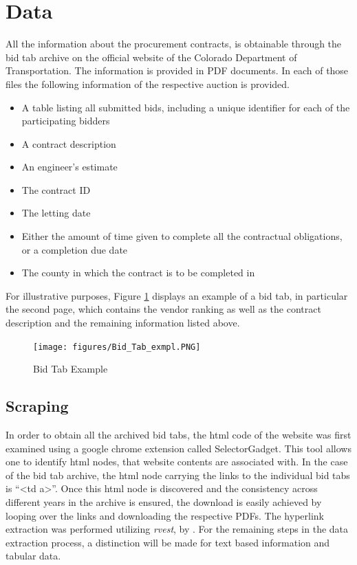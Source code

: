 \documentclass[a4paper,12pt, headsepline]{scrartcl}
\numberwithin{equation}{section}
\begin{document}
\section{Data}\label{sec:data}

All the information about the procurement contracts, is obtainable through the bid tab archive on the official website of the Colorado Department of Transportation. The information is provided in PDF documents. In each of those files the following information of the respective auction is provided.

\begin{itemize}
	\item A table listing all submitted bids, including a unique identifier for each of the participating bidders
	\item A contract description
	\item An engineer's estimate
	\item The contract ID
	\item The letting date
	\item Either the amount of time given to complete all the contractual obligations, or a completion due date
	\item The county in which the contract is to be completed in 
\end{itemize}

For illustrative purposes, Figure \ref{fig:bidtab} displays an example of a bid tab, in particular the second page, which contains the vendor ranking as well as the contract description and the remaining information listed above.

\begin{figure}[H]
	\texttt{[image: figures/Bid\_Tab\_exmpl.PNG]}
	\caption{Bid Tab Example}\label{fig:bidtab}
\end{figure}

\subsection{Scraping}\label{subsec:scrap}
In order to obtain all the archived bid tabs, the html code of the website was first examined using a google chrome extension called SelectorGadget. This tool allows one to identify html nodes, that website contents are associated with. In the case of the bid tab archive, the html node carrying the links to the individual bid tabs is \enquote{<td a>}. Once this html node is discovered and the consistency across different years in the archive is ensured, the download is easily achieved by looping over the links and downloading the  respective PDFs. The hyperlink extraction was performed utilizing \textit{rvest}, by \citet{rvest}. For the remaining steps in the data extraction process, a distinction will be made for text based information and tabular data.
\end{document}
